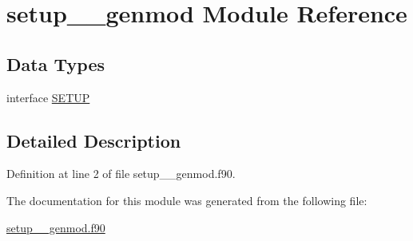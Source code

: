 \hypertarget{classsetup____genmod}{\section{setup\+\_\+\+\_\+genmod Module Reference}
\label{classsetup____genmod}
}
\subsection*{Data Types}
\begin{DoxyCompactItemize}
\item 
interface \hyperlink{interfacesetup____genmod_1_1SETUP}{S\+E\+T\+U\+P}
\end{DoxyCompactItemize}


\subsection{Detailed Description}


Definition at line 2 of file setup\+\_\+\+\_\+genmod.\+f90.



The documentation for this module was generated from the following file\+:\begin{DoxyCompactItemize}
\item 
\hyperlink{setup____genmod_8f90}{setup\+\_\+\+\_\+genmod.\+f90}\end{DoxyCompactItemize}
